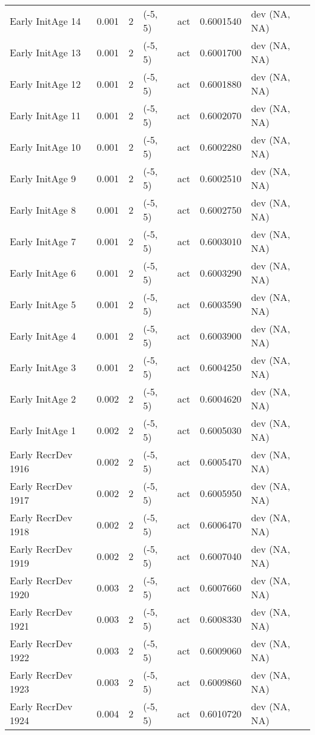 \documentclass[11pt,
  english,
  letterpaper,
]{article}
\begin{document}
\begin{landscape}
\begin{longtable}[t]{>{\raggedright\arraybackslash}p{7cm}lllll>{\raggedright\arraybackslash}p{4cm}}
Early InitAge 14 & 0.001 & 2 & (-5, 5) & act & 0.6001540 & dev (NA, NA)\\
Early InitAge 13 & 0.001 & 2 & (-5, 5) & act & 0.6001700 & dev (NA, NA)\\
Early InitAge 12 & 0.001 & 2 & (-5, 5) & act & 0.6001880 & dev (NA, NA)\\
Early InitAge 11 & 0.001 & 2 & (-5, 5) & act & 0.6002070 & dev (NA, NA)\\
Early InitAge 10 & 0.001 & 2 & (-5, 5) & act & 0.6002280 & dev (NA, NA)\\
Early InitAge 9 & 0.001 & 2 & (-5, 5) & act & 0.6002510 & dev (NA, NA)\\
Early InitAge 8 & 0.001 & 2 & (-5, 5) & act & 0.6002750 & dev (NA, NA)\\
Early InitAge 7 & 0.001 & 2 & (-5, 5) & act & 0.6003010 & dev (NA, NA)\\
Early InitAge 6 & 0.001 & 2 & (-5, 5) & act & 0.6003290 & dev (NA, NA)\\
Early InitAge 5 & 0.001 & 2 & (-5, 5) & act & 0.6003590 & dev (NA, NA)\\
Early InitAge 4 & 0.001 & 2 & (-5, 5) & act & 0.6003900 & dev (NA, NA)\\
Early InitAge 3 & 0.001 & 2 & (-5, 5) & act & 0.6004250 & dev (NA, NA)\\
Early InitAge 2 & 0.002 & 2 & (-5, 5) & act & 0.6004620 & dev (NA, NA)\\
Early InitAge 1 & 0.002 & 2 & (-5, 5) & act & 0.6005030 & dev (NA, NA)\\
Early RecrDev 1916 & 0.002 & 2 & (-5, 5) & act & 0.6005470 & dev (NA, NA)\\
Early RecrDev 1917 & 0.002 & 2 & (-5, 5) & act & 0.6005950 & dev (NA, NA)\\
Early RecrDev 1918 & 0.002 & 2 & (-5, 5) & act & 0.6006470 & dev (NA, NA)\\
Early RecrDev 1919 & 0.002 & 2 & (-5, 5) & act & 0.6007040 & dev (NA, NA)\\
Early RecrDev 1920 & 0.003 & 2 & (-5, 5) & act & 0.6007660 & dev (NA, NA)\\
Early RecrDev 1921 & 0.003 & 2 & (-5, 5) & act & 0.6008330 & dev (NA, NA)\\
Early RecrDev 1922 & 0.003 & 2 & (-5, 5) & act & 0.6009060 & dev (NA, NA)\\
Early RecrDev 1923 & 0.003 & 2 & (-5, 5) & act & 0.6009860 & dev (NA, NA)\\
Early RecrDev 1924 & 0.004 & 2 & (-5, 5) & act & 0.6010720 & dev (NA, NA)\\

\end{longtable}
\end{landscape}
\end{document}
